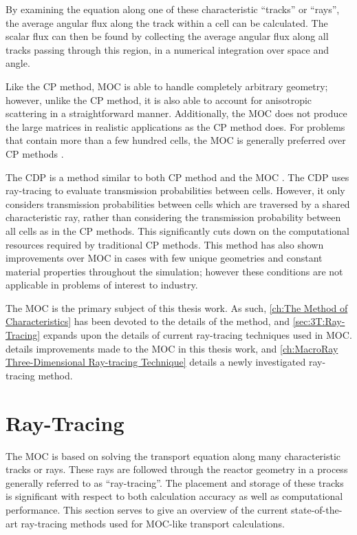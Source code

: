 {{    By examining the equation along one of these characteristic ``tracks'' or ``rays'', the average angular flux along the track within a cell can be calculated.
    The scalar flux can then be found by collecting the average angular flux along all tracks passing through this region, in a numerical integration over space and angle.

    Like the \ac{CP} method, \ac{MOC} is able to handle completely arbitrary geometry; however, unlike the \ac{CP} method, it is also able to account for anisotropic scattering in a straightforward manner.
    Additionally, the \ac{MOC} does not produce the large matrices in realistic applications as the \ac{CP} method does.
    For problems that contain more than a few hundred cells, the \ac{MOC} is generally preferred over \ac{CP} methods \cite{Hebert2010}.

    The \ac{CDP} is a method similar to both \ac{CP} method and the \ac{MOC} \cite{Hong1999,Liu2014}.
    The \ac{CDP} uses ray-tracing to evaluate transmission probabilities between cells.
    However, it only considers transmission probabilities between cells which are traversed by a shared characteristic ray, rather than considering the transmission probability between all cells as in the \ac{CP} methods.
    This significantly cuts down on the computational resources required by traditional \ac{CP} methods.
    This method has also shown improvements over \ac{MOC} in cases with few unique geometries and constant material properties throughout the simulation; however these conditions are not applicable in problems of interest to industry.

    The \ac{MOC} is the primary subject of this thesis work.
    As such, \cref{ch:The Method of Characteristics} has been devoted to the details of the method, and \cref{sec:3T:Ray-Tracing} expands upon the details of current ray-tracing techniques used in \ac{MOC}.
     details improvements made to the \ac{MOC} in this thesis work, and \cref{ch:MacroRay Three-Dimensional Ray-tracing Technique} details a newly investigated ray-tracing method.
  }

  \section{Ray-Tracing}{\label{sec:3T:Ray-Tracing}
    The \acf{MOC} \cite{Askew1972} is based on solving the transport equation along many characteristic tracks or rays.
    These rays are followed through the reactor geometry in a process generally referred to as ``ray-tracing''.
    The placement and storage of these tracks is significant with respect to both calculation accuracy as well as computational performance.
    This section serves to give an overview of the current state-of-the-art ray-tracing methods used for \ac{MOC}-like transport calculations.

}}
